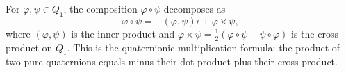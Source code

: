 For $\varphi, \psi \in Q_1$, the composition $\varphi \circ \psi$ decomposes as
$$
\varphi \circ \psi = -(\varphi, \psi) \iota + \varphi \times \psi,
$$
where $(\varphi, \psi)$ is the inner product and $\varphi \times \psi = \frac{1}{2}(\varphi \circ \psi - \psi \circ \varphi)$ is the cross product on $Q_1$. This is the quaternionic multiplication formula: the product of two pure quaternions equals minus their dot product plus their cross product.
